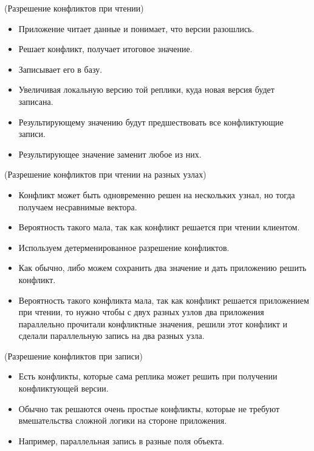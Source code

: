 \begin{algorithm}(Разрешение конфликтов при чтении)
    \begin{itemize}
        \item Приложение читает данные и понимает, что версии разошлись.
        \item Решает конфликт, получает итоговое значение.
        \item Записывает его в базу.
        \item Увеличивая локальную версию той реплики, куда новая версия будет записана.
        \item Результирующему значению будут предшествовать все конфликтующие записи.
        \item Результирующее значение заменит любое из них.
    \end{itemize}
\end{algorithm}

\begin{algorithm}(Разрешение конфликтов при чтении на разных узлах)
    \begin{itemize}
        \item Конфликт может быть одновременно решен на нескольких узнал, но тогда получаем несравнимые вектора.
        \item Вероятность такого мала, так как конфликт решается при чтении клиентом.
        \item Используем детерменированное разрешение конфликтов.
        \item Как обычно, либо можем сохранить два значение и дать приложению решить конфликт.
        \item Вероятность такого конфликта мала, так как конфликт решается приложением при чтении,
            то нужно чтобы с двух разных узлов два приложения параллельно прочитали конфликтные значения, решили этот конфликт и сделали параллельную запись на два разных узла.
    \end{itemize}
\end{algorithm}

\begin{algorithm}(Разрешение конфликтов при записи)
    \begin{itemize}
        \item Есть конфликты, которые сама реплика может решить при получении конфликтующей версии.
        \item Обычно так решаются очень простые конфликты, которые не требуют вмешательства сложной логики на стороне приложения.
        \item Например, параллельная запись в разные поля объекта.
    \end{itemize}
\end{algorithm}


